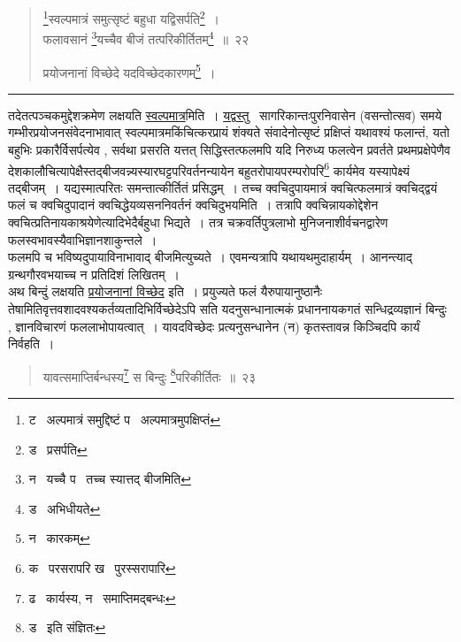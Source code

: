 \documentclass[11pt, openany]{book}
\begin{document}
\newpage

\begin{quote}
{\na \renewcommand{\thefootnote}{1}\footnote{ट \textendash\ अल्पमात्रं समुद्दिष्टं प \textendash\ अल्पमात्रमुपक्षिप्तं}स्वल्पमात्रं समुत्सृष्टं बहुधा यद्विसर्पति\renewcommand{\thefootnote}{2}\footnote{ड \textendash\ प्रसर्पति}~।\\
फलावसानं \renewcommand{\thefootnote}{3}\footnote{न \textendash\ यच्चै प \textendash\ तच्च स्यात्तद् बीजमिति}यच्चैव बीजं तत्परिकीर्तितम्\renewcommand{\thefootnote}{4}\footnote{ड \textendash\ अभिधीयते}~॥~२२

प्रयोजनानां विच्छेदे यदविच्छेदकारणम्\renewcommand{\thefootnote}{5}\footnote{न \textendash\ कारकम्}~।}
\end{quote}

\hrule

\vspace{2mm}
तदेतत्पञ्चकमुद्देशक्रमेण लक्षयति \underline{स्वल्पमात्र}मिति~। \underline{यद्वस्तु} \textendash\ सागरिकान्तःपुरनिवासेन (वसन्तोत्सव) समये गम्भीरप्रयोजनसंवेदनाभावात् स्वल्पमात्रमकिंचित्करप्रायं शंक्यते संवादेनोत्सृष्टं प्रक्षिप्तं यथावश्यं फलान्तं, यतो बहुभिः प्रकारैर्विसर्पत्येव , सर्वथा प्रसरति यत्तत् सिद्धिस्तत्फलमपि यदि निरुध्य फलत्वेन प्रवर्तते प्रथमप्रक्षेपेणैव देशकालौचित्यापेक्षैस्तद्बीजवन्न्यस्यारघट्टपरिवर्तनन्यायेन बहुतरोपायपरम्परोपरि\renewcommand{\thefootnote}{1}\footnote{क \textendash\ परसरापरि ख \textendash\ पुरस्सरापारि} कार्यमेव यस्यापेक्ष्यं तद्बीजम्~। यद्यस्मात्परितः समन्तात्कीर्तितं प्रसिद्धम्~। तच्च क्वचिदुपायमात्रं क्वचित्फलमात्रं क्वचिद्द्वयं फलं च क्वचिदुपादानं क्वचिद्धेयव्यसननिवर्तनं क्वचिदुभयमिति~। तत्रापि क्वचिन्नायकोद्देशेन क्वचित्प्रतिनायकाश्रयेणेत्यादिभेदैर्बहुधा भिद्यते~। तत्र चक्रवर्तिपुत्रलाभो मुनिजनाशीर्वचनद्वारेण फलस्वभावस्यैवाभिज्ञानशाकुन्तले~।\\

फलमपि च भविष्यदुपायाविनाभावाद् बीजमित्युच्यते~। एवमन्यत्रापि यथायथमुदाहार्यम्~। आनन्त्याद् ग्रन्थगौरवभयाच्च न प्रतिदिशं लिखितम्~।\\

अथ बिन्दुं लक्षयति \underline{प्रयोजनानां विच्छेद} इति~। प्रयुज्यते फलं यैरुपायानुष्ठानैः तेषामितिवृत्तवशादवश्यकर्तव्यतादिभिर्विच्छेदेऽपि सति यदनुसन्धानात्मकं प्रधाननायकगतं सन्धिद्रव्यज्ञानं बिन्दुः , ज्ञानविचारणं फललाभोपायत्वात्~। यावदविच्छेदः प्रत्यनुसन्धानेन (न) कृतस्तावन्न किञ्चिदपि कार्यं निर्वहति~।


\newpage

\begin{quote}
{\na यावत्समाप्तिर्बन्धस्य\renewcommand{\thefootnote}{1}\footnote{ढ \textendash\ कार्यस्य, न \textendash\ समाप्तिमद्बन्धः} स बिन्दुः \renewcommand{\thefootnote}{2}\footnote{ड \textendash\ इति संज्ञितः}परिकीर्तितः~॥~२३}
\end{quote}
\end{document}
